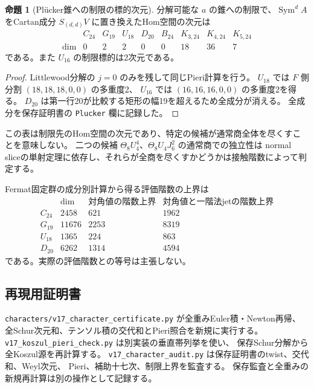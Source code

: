 \documentclass[a4paper,11pt]{ltjsarticle}
\theoremstyle{definition}
\newtheorem{proposition}[theorem]{命題}
\begin{document}
\begin{proposition}[Pl\"ucker錐への制限の標的次元]
\label{prop:v17-plucker-dimensions}
分解可能な $a$ の錐への制限で、$\operatorname{Sym}^dA$ をCartan成分
$S_{(d,d)}V$ に置き換えたHom空間の次元は
\[
\begin{array}{c|rrrrrrrr}
 &C_{24}&G_{19}&U_{18}&D_{20}&B_{24}&K_{3,24}&K_{4,24}&K_{5,24}\\\hline
 \dim&0&2&2&0&0&18&36&7
\end{array}
\]
である。また $U_{16}$ の制限標的は2次元である。
\end{proposition}

\begin{proof}
Littlewood分解の $j=0$ のみを残して同じPieri計算を行う。
$U_{18}$ では $F$ 側分割 $(18,18,18,0,0)$ の多重度2、
$U_{16}$ では $(16,16,16,0,0)$ の多重度2を得る。
$D_{20}$ は第一行20が比較する矩形の幅19を超えるため全成分が消える。
全成分を保存証明書の \texttt{Plucker} 欄に記録した。
\end{proof}

この表は制限先のHom空間の次元であり、特定の候補が通常商全体を尽くすことを意味しない。
二つの候補 $\Theta_8U_4^4$、$\Theta_8U_4J_6^2$ の通常商での独立性は
normal sliceの単射定理に依存し、それらが全商を尽くすかどうかは接触階数によって判定する。

Fermat固定群の成分別計算から得る評価階数の上界は
\[
\begin{array}{c|r|r|r}
 &\dim&\text{対角値の階数上界}&\text{対角値と一階法jetの階数上界}\\\hline
C_{24}&2458&621&1962\\
G_{19}&11676&2253&8319\\
U_{18}&1365&224&863\\
D_{20}&6262&1314&4594
\end{array}
\]
である。実際の評価階数との等号は主張しない。

\subsection{再現用証明書}

\texttt{characters/v17\_character\_certificate.py} が全重みEuler積・Newton再帰、
全Schur次元和、テンソル積の交代和とPieri照合を新規に実行する。
\texttt{v17\_koszul\_pieri\_check.py} は別実装の垂直帯列挙を使い、
保存Schur分解から全Koszul源を再計算する。
\texttt{v17\_character\_audit.py} は保存証明書のtwist、交代和、Weyl次元、
Pieri、補助十七次、制限上界を監査する。
保存監査と全重みの新規再計算は別の操作として記録する。
\end{document}
